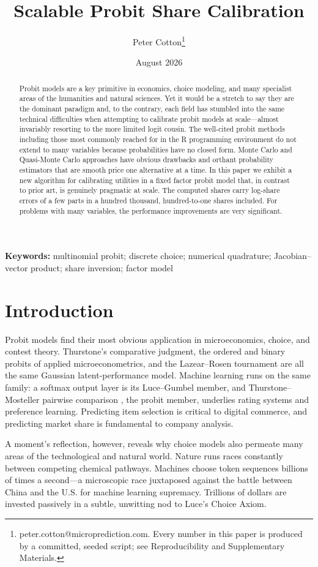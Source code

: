 \documentclass[12pt]{article}
\title{Scalable Probit Share Calibration}
\author{Peter Cotton\thanks{peter.cotton@microprediction.com. Every
number in this paper is produced by a committed, seeded script; see
Reproducibility and Supplementary Materials.}}
\date{August 2026}
\theoremstyle{remark}
\begin{document}
\maketitle

\begin{abstract}
Probit models are a key primitive in economics, choice modeling, and many specialist areas of the humanities and natural sciences. Yet it
would be a stretch to say they are the dominant paradigm and, to the contrary, each field
has stumbled into the same technical difficulties when attempting to calibrate probit models
at scale---almost invariably resorting to the more limited logit cousin. The well-cited probit methods including
 those most commonly reached for in the R programming
environment do not extend to many variables because probabilities have no closed form. Monte 
Carlo and Quasi-Monte Carlo approaches have obvious drawbacks and orthant probability estimators that
are smooth price one alternative at a time. In this paper we exhibit a new algorithm for calibrating
utilities in a fixed factor probit model that, in contrast to prior art, is genuinely pragmatic at scale. The computed shares carry log-share errors of a few parts in
a hundred thousand, hundred-to-one shares included. For problems with many variables, the
performance improvements are very significant. 
\end{abstract}

\noindent\textbf{Keywords:} multinomial probit; discrete choice;
numerical quadrature; Jacobian--vector product; share inversion; factor
model

\section{Introduction}

Probit models find their most obvious application in microeconomics, choice, and contest theory. 
Thurstone's comparative judgment, the ordered and binary probits of applied
microeconometrics, and the Lazear--Rosen tournament
\citep{lazear1981} are all the same
Gaussian latent-performance model. Machine learning runs on the same
family: a softmax output layer is its Luce--Gumbel member, and
Thurstone--Mosteller pairwise comparison \citep{mosteller1951}, the
probit member, underlies
rating systems and preference learning. Predicting item selection is critical to digital commerce, and 
predicting market share is fundamental to company analysis.  

A moment's reflection, however, reveals why choice models also permeate many areas of the technological and natural world. Nature runs races constantly between
competing chemical pathways. Machines choose token sequences billions of times a second---a microscopic race juxtaposed against the battle
between China and the U.S. for machine learning supremacy. Trillions of dollars are invested passively in a subtle, unwitting nod to Luce's Choice Axiom.
\end{document}
